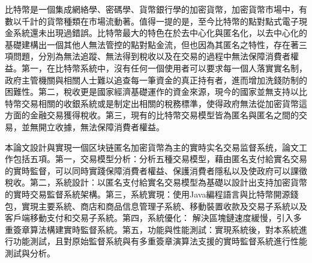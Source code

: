 
\begin{cabstract}

	比特幣是一個集成網絡學、密碼學、貨幣銀行學的加密貨幣，加密貨幣市場中，有數以千計的貨幣種類在市場流動著。值得一提的是，至今比特幣的點對點式電子現金系統還未出現過錯誤。比特幣最大的特色在於去中心化與匿名化，以去中心化的基礎建構出一個其他人無法管控的點對點金流，但也因為其匿名之特性，存在著三項問題，分別為無法追蹤、無法得到稅收以及在交易的過程中無法保障消費者權益。第一，在比特幣系統中，沒有任何一個使用者可以要求每一個人落實實名制，政府主管機關與相關人士難以追查每⼀筆資金的真正持有者，進而增加洗錢防制的困難性。第二，稅收更是國家經濟基礎運作的資金來源，現今的國家並無支持以比特幣交易相關的收銀系統或是制定出相關的稅務標準，使得政府無法從加密貨幣這方面的金融交易獲得稅收。第三，現有的比特幣交易模型皆為匿名與匿名之間的交易，並無開立收據，無法保障消費者權益。

	本論文設計與實現一個区块链匿名加密貨幣為主的實時实名交易监督系统，論文工作包括五項。第一，交易模型分析：分析五種交易模型，藉由匿名支付給實名交易的實時監督，可以同時實踐保障消費者權益、保護消費者隱私以及使政府可以課徵稅收。第二，系統設計：以匿名支付給實名交易模型為基礎以設計出支持加密貨幣的實時交易監督系統架構。第三，系統實現：使用Java編程語言與比特幣開源錢包，實現主要系統、商店和商品信息管理子系統、移動裝置收款及交易子系統以及客戶端移動支付和交易子系統。第四，系統優化：
	解決區塊鏈速度緩慢，引入多重簽章算法構建實時監督系統。第五，功能與性能測試：實現系統後，對本系統進行功能測試，且對原始監督系統與有多重簽章演算法支援的實時監督系統進行性能測試與分析。



\end{cabstract}

